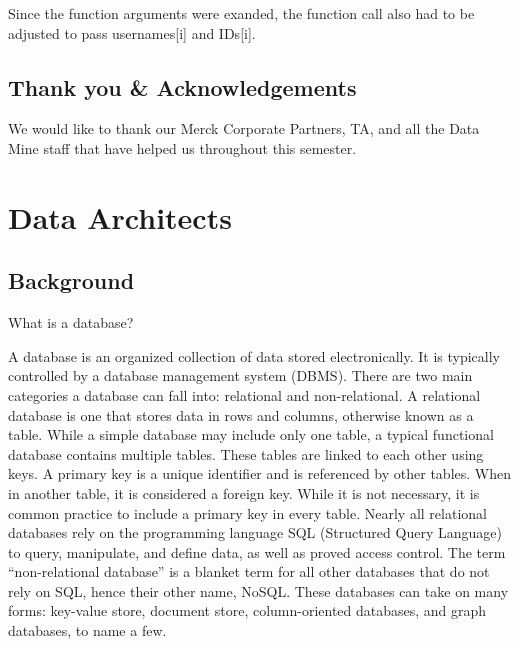 \documentclass[]{book}
\newenvironment{Shaded}{\begin{snugshade}}{\end{snugshade}}
\newcommand{\KeywordTok}[1]{\textcolor[rgb]{0.13,0.29,0.53}{\textbf{#1}}}
\newcommand{\DecValTok}[1]{\textcolor[rgb]{0.00,0.00,0.81}{#1}}
\newcommand{\SpecialCharTok}[1]{\textcolor[rgb]{0.00,0.00,0.00}{#1}}
\newcommand{\StringTok}[1]{\textcolor[rgb]{0.31,0.60,0.02}{#1}}
\newcommand{\CommentTok}[1]{\textcolor[rgb]{0.56,0.35,0.01}{\textit{#1}}}
\newcommand{\ControlFlowTok}[1]{\textcolor[rgb]{0.13,0.29,0.53}{\textbf{#1}}}
\newcommand{\OperatorTok}[1]{\textcolor[rgb]{0.81,0.36,0.00}{\textbf{#1}}}
\newcommand{\BuiltInTok}[1]{#1}
\newcommand{\NormalTok}[1]{#1}
\begin{document}
Since the function arguments were exanded, the function call also had to
be adjusted to pass usernames{[}i{]} and IDs{[}i{]}.

\begin{Shaded}
\end{Shaded}

\section{Thank you \&
Acknowledgements}\label{thank-you-acknowledgements}

We would like to thank our Merck Corporate Partners, TA, and all the
Data Mine staff that have helped us throughout this semester.

\chapter{Data Architects}\label{data-architects}

\section{Background}\label{background}

What is a database?

A database is an organized collection of data stored electronically. It
is typically controlled by a database management system (DBMS). There
are two main categories a database can fall into: relational and
non-relational. A relational database is one that stores data in rows
and columns, otherwise known as a table. While a simple database may
include only one table, a typical functional database contains multiple
tables. These tables are linked to each other using keys. A primary key
is a unique identifier and is referenced by other tables. When in
another table, it is considered a foreign key. While it is not
necessary, it is common practice to include a primary key in every
table. Nearly all relational databases rely on the programming language
SQL (Structured Query Language) to query, manipulate, and define data,
as well as proved access control. The term ``non-relational database''
is a blanket term for all other databases that do not rely on SQL, hence
their other name, NoSQL. These databases can take on many forms:
key-value store, document store, column-oriented databases, and graph
databases, to name a few.
\end{document}
